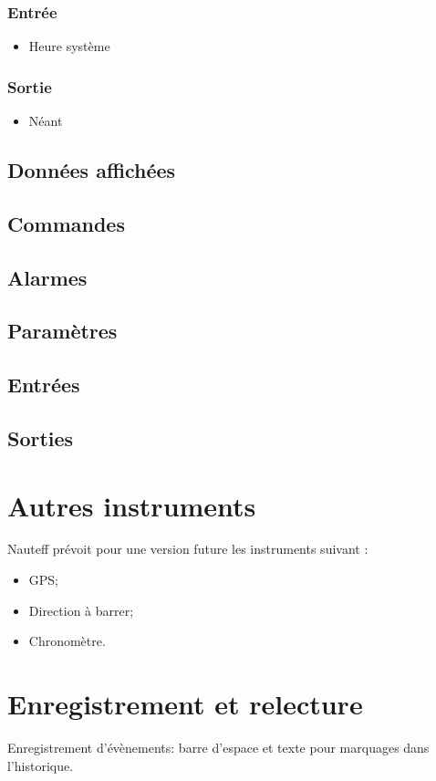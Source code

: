 \documentclass[a4paper,11pt]{report}
\begin{document}
\subsubsection{Entrée}
\begin{itemize}
	\item Heure système
\end{itemize}

\subsubsection{Sortie}
\begin{itemize}
	\item Néant
\end{itemize}

\subsection{Données affichées}
\subsection{Commandes}
\subsection{Alarmes}
\subsection{Paramètres}
\subsection{Entrées}
\subsection{Sorties}

\section{Autres instruments}
Nauteff prévoit pour une version future les instruments suivant :
\begin{itemize}
	\item GPS;
	\item Direction à barrer;
	\item Chronomètre.
\end{itemize}


\section{Enregistrement et relecture}
Enregistrement d'évènements: barre d'espace et texte pour marquages dans l'historique.
\end{document}
